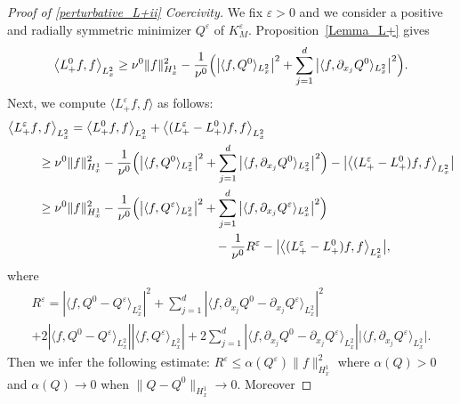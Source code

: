 \documentclass[10pt]{amsart}
\theoremstyle{definition}
\newenvironment{ProofOf}[1]{\begin{proof}[Proof of #1]}{\end{proof}}
\begin{document}
\begin{ProofOf}{\eqref{perturbative_L+ii} Coercivity}
We fix $\varepsilon>0$ and we consider a positive and radially symmetric minimizer $Q^{\varepsilon}$ of $K_{M}^{\varepsilon}$. Proposition~\ref{Lemma_L+} gives
\[
\left\langle L_{+}^{0}f,f\right\rangle_{L_{x}^{2}}\geq\nu^{0}\|f\|_{H_{x}^{1}}^{2}-\frac{1}{\nu^{0}}\Bigl(\left|\langle f,Q^{0}\rangle_{L_{x}^{2}}\right|^{2}+\sum\limits_{j=1}^{d}\left|\langle f,\partial_{x_{j}}Q^{0}\rangle_{L_{x}^{2}}\right|^{2}\Bigr).
\]
Next, we compute $\langle L_{+}^{\varepsilon}f,f\rangle$ as follows:
\begin{align*}
\bigl\langle L_{+}^{\varepsilon}f&,f\bigr\rangle_{L_{x}^{2}}=\left\langle L_{+}^{0}f,f\right\rangle_{L_{x}^{2}}+\left\langle (L_{+}^{\varepsilon}-L_{+}^{0})f,f\right\rangle_{L_{x}^{2}}\\
&\geq\nu^{0}\|f\|_{H_{x}^{1}}^{2}-\frac{1}{\nu^{0}}\Bigl(\left|\langle f,Q^{0}\rangle_{L_{x}^{2}}\right|^{2}+\sum\limits_{j=1}^{d}\left|\langle f,\partial_{x_{j}}Q^{0}\rangle_{L_{x}^{2}}\right|^{2}\Bigr)-\bigl|\left\langle(L_{+}^{\varepsilon}-L_{+}^{0})f,f\right\rangle_{L_{x}^{2}}\bigr|
\\
&\geq\nu^{0}\|f\|_{H_{x}^{1}}^{2}-\frac{1}{\nu^{0}}\Bigl(\left|\langle f,Q^{\varepsilon}\rangle_{L_{x}^{2}}\right|^{2}+\sum\limits_{j=1}^{d}\left|\langle f,\partial_{x_{j}}Q^{\varepsilon}\rangle_{L_{x}^{2}}\right|^{2}\Bigr)
\\
&\hspace*{5cm}-\frac{1}{\nu^{0}}R^{\varepsilon}-\bigl|\left\langle(L_{+}^{\varepsilon}-L_{+}^{0})f,f\right\rangle_{L_{x}^{2}}\bigr|,
\end{align*}
where\vspace*{-5pt}
\begin{multline*}
R^{\varepsilon}=\left|\langle f,Q^{0}-Q^{\varepsilon}\rangle_{L_{x}^{2}}\right|^{2}+\sum\limits_{j=1}^{d}\left|\langle f,\partial_{x_{j}}Q^{0}-\partial_{x_{j}}Q^{\varepsilon}\rangle_{L_{x}^{2}}\right|^{2}\\[
-8pt]
+2\left|\langle f,Q^{0}-Q^{\varepsilon}\rangle_{L_{x}^{2}}\right|\left|\langle f,Q^{\varepsilon}\rangle_{L_{x}^{2}}\right|+2\sum\limits_{j=1}^{d}\left|\langle f,\partial_{x_{j}}Q^{0}-\partial_{x_{j}}Q^{\varepsilon}\rangle_{L_{x}^{2}}\right|\bigl|\langle f,\partial_{x_{j}}Q^{\varepsilon}\rangle_{L_{x}^{2}}\bigr|.
\end{multline*}
Then we infer the following estimate: $R^{\varepsilon}\!\leq\!\alpha(Q^{\varepsilon})\|f\|_{H_{x}^{1}}^{2}$ where $\alpha(Q)\!>\!0$ and \hbox{$\alpha(Q)\!\to\! 0$} when $\|Q-Q^{0}\|_{H_{x}^{1}}\to 0$. Moreover\vspace*{-5pt}

\end{ProofOf}
\end{document}
